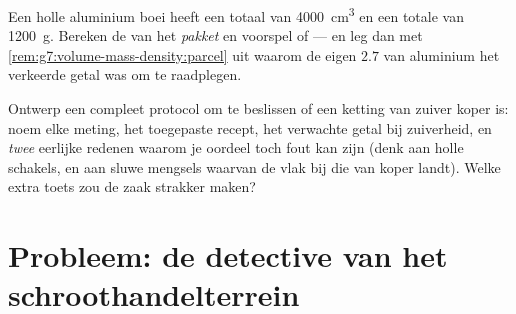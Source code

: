 \begin{exercise}[$\star\star$]\label{exo:g7:volume-mass-density:11}
Een holle aluminium boei heeft een totaal  van
\qty{4000}{cm^3} en een totale  van \qty{1200}{g}. Bereken de
 van het \emph{pakket} en voorspel  of
 --- en leg dan met \cref{rem:g7:volume-mass-density:parcel} uit
waarom de eigen $2.7$ van aluminium het verkeerde getal was om te
raadplegen.
\end{exercise}

\begin{exercise}[$\star\star\star$]\label{exo:g7:volume-mass-density:12}
Ontwerp een compleet protocol om te beslissen of een ketting van
zuiver koper is: noem elke meting, het toegepaste recept, het
verwachte getal bij zuiverheid, en \emph{twee} eerlijke redenen
waarom je oordeel toch fout kan zijn (denk aan holle schakels, en aan
sluwe mengsels waarvan de  vlak bij die van koper landt).
Welke extra toets zou de zaak strakker maken?
\end{exercise}

\section{Probleem: de detective van het schroothandelterrein}

